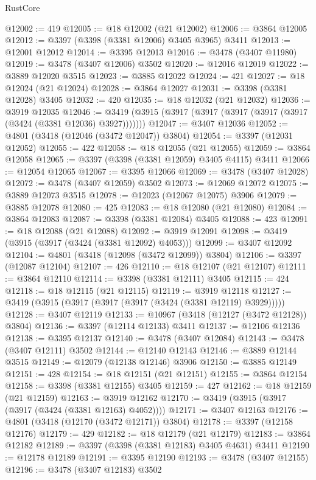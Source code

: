 \begin{lexlean}{RustCore}
\begin{coremodule}
@12002 := 419
@12005 := @18 @12002 (@21 @12002)
@12006 := @3864 @12005
@12012 := @3397 (@3398 (@3381 @12006) @3405 @3965) @3411
@12013 := @12001 @12012
@12014 := @3395 @12013
@12016 := @3478 (@3407 @11980)
@12019 := @3478 (@3407 @12006) @3502
@12020 := @12016 @12019
@12022 := @3889 @12020 @3515
@12023 := @3885 @12022
@12024 := 421
@12027 := @18 @12024 (@21 @12024)
@12028 := @3864 @12027
@12031 := @3398 (@3381 @12028) @3405
@12032 := 420
@12035 := @18 @12032 (@21 @12032)
@12036 := @3919 @12035
@12046 := @3419 (@3915 (@3917 (@3917 (@3917 (@3917 (@3917 (@3424 (@3381 @12036) @3927)))))))
@12047 := @3407 @12036
@12052 := @4801 (@3418 (@12046 (@3472 @12047)) @3804)
@12054 := @3397 (@12031 @12052)
@12055 := 422
@12058 := @18 @12055 (@21 @12055)
@12059 := @3864 @12058
@12065 := @3397 (@3398 (@3381 @12059) @3405 @4115) @3411
@12066 := @12054 @12065
@12067 := @3395 @12066
@12069 := @3478 (@3407 @12028)
@12072 := @3478 (@3407 @12059) @3502
@12073 := @12069 @12072
@12075 := @3889 @12073 @3515
@12078 := @12023 (@12067 @12075) @3906
@12079 := @3885 @12078
@12080 := 425
@12083 := @18 @12080 (@21 @12080)
@12084 := @3864 @12083
@12087 := @3398 (@3381 @12084) @3405
@12088 := 423
@12091 := @18 @12088 (@21 @12088)
@12092 := @3919 @12091
@12098 := @3419 (@3915 (@3917 (@3424 (@3381 @12092) @4053)))
@12099 := @3407 @12092
@12104 := @4801 (@3418 (@12098 (@3472 @12099)) @3804)
@12106 := @3397 (@12087 @12104)
@12107 := 426
@12110 := @18 @12107 (@21 @12107)
@12111 := @3864 @12110
@12114 := @3398 (@3381 @12111) @3405
@12115 := 424
@12118 := @18 @12115 (@21 @12115)
@12119 := @3919 @12118
@12127 := @3419 (@3915 (@3917 (@3917 (@3917 (@3424 (@3381 @12119) @3929)))))
@12128 := @3407 @12119
@12133 := @10967 (@3418 (@12127 (@3472 @12128)) @3804)
@12136 := @3397 (@12114 @12133) @3411
@12137 := @12106 @12136
@12138 := @3395 @12137
@12140 := @3478 (@3407 @12084)
@12143 := @3478 (@3407 @12111) @3502
@12144 := @12140 @12143
@12146 := @3889 @12144 @3515
@12149 := @12079 (@12138 @12146) @3906
@12150 := @3885 @12149
@12151 := 428
@12154 := @18 @12151 (@21 @12151)
@12155 := @3864 @12154
@12158 := @3398 (@3381 @12155) @3405
@12159 := 427
@12162 := @18 @12159 (@21 @12159)
@12163 := @3919 @12162
@12170 := @3419 (@3915 (@3917 (@3917 (@3424 (@3381 @12163) @4052))))
@12171 := @3407 @12163
@12176 := @4801 (@3418 (@12170 (@3472 @12171)) @3804)
@12178 := @3397 (@12158 @12176)
@12179 := 429
@12182 := @18 @12179 (@21 @12179)
@12183 := @3864 @12182
@12189 := @3397 (@3398 (@3381 @12183) @3405 @4631) @3411
@12190 := @12178 @12189
@12191 := @3395 @12190
@12193 := @3478 (@3407 @12155)
@12196 := @3478 (@3407 @12183) @3502

\end{coremodule}
\end{lexlean}
